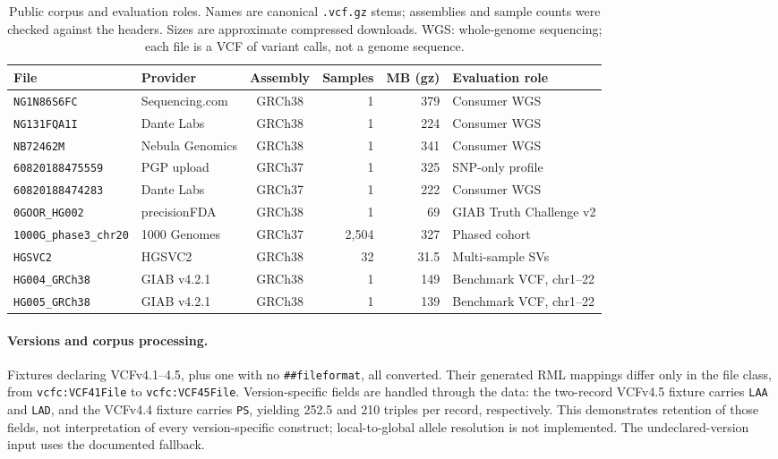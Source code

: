 \documentclass[11pt]{article}
\begin{document}
\begin{table}[!htbp]
\caption{Public corpus and evaluation roles. Names are canonical \texttt{.vcf.gz} stems; assemblies and sample counts were checked against the headers. Sizes are approximate compressed downloads. WGS: whole-genome sequencing; each file is a VCF of variant calls, not a genome sequence.}\label{tab:corpus}%
\centering\footnotesize\setlength{\tabcolsep}{4pt}\renewcommand{\arraystretch}{1.1}%
\begin{tabularx}{\textwidth}{@{}l l c r r >{\raggedright\arraybackslash}X@{}}
\toprule
\textbf{File} & \textbf{Provider} & \textbf{Assembly} & \textbf{Samples} & \textbf{MB (gz)} & \textbf{Evaluation role}\\
\midrule
\texttt{NG1N86S6FC}     & Sequencing.com  & GRCh38 & 1 & 379 & Consumer WGS\\
\texttt{NG131FQA1I}     & Dante Labs      & GRCh38 & 1 & 224 & Consumer WGS\\
\texttt{NB72462M}       & Nebula Genomics & GRCh38 & 1 & 341 & Consumer WGS\\
\texttt{60820188475559} & PGP upload      & GRCh37 & 1 & 325 & SNP-only profile\\
\texttt{60820188474283} & Dante Labs      & GRCh37 & 1 & 222 & Consumer WGS\\
\texttt{0GOOR\_HG002}   & precisionFDA    & GRCh38 & 1 & 69  & GIAB Truth Challenge v2\\
\texttt{1000G\_phase3\_chr20} & 1000 Genomes & GRCh37 & 2{,}504 & 327  & Phased cohort\\
\texttt{HGSVC2}               & HGSVC2       & GRCh38 & 32      & 31.5 & Multi-sample SVs\\
\texttt{HG004\_GRCh38}        & GIAB v4.2.1  & GRCh38 & 1       & 149  & Benchmark VCF, chr1--22\\
\texttt{HG005\_GRCh38}        & GIAB v4.2.1  & GRCh38 & 1       & 139  & Benchmark VCF, chr1--22\\
\bottomrule
\end{tabularx}
\end{table}

\paragraph{Versions and corpus processing.}
Fixtures declaring VCFv4.1--4.5, plus one with no \texttt{\#\#fileformat}, all converted.
Their generated RML mappings differ only in the file class, from \texttt{vcfc:VCF41File} to \texttt{vcfc:VCF45File}.
Version-specific fields are handled through the data: the two-record VCFv4.5 fixture carries \texttt{LAA} and \texttt{LAD}, and the VCFv4.4 fixture carries \texttt{PS}, yielding 252.5 and 210 triples per record, respectively.
This demonstrates retention of those fields, not interpretation of every version-specific construct; local-to-global allele resolution is not implemented.
The undeclared-version input uses the documented fallback.
\end{document}
